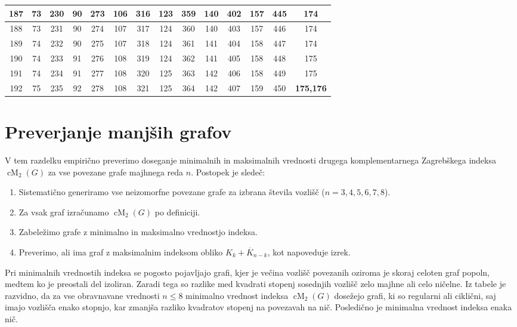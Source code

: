 \documentclass[fin1, tisk]{fmfdelo}
\newcommand{\cM}{\operatorname{cM}_2}
\begin{document}
{\begin{center}
\begin{tabular}{|c|c||c|c||c|c||c|c||c|c||c|c||c|c|}
187 & 73 & 230 & 90 & 273 & 106 & 316 & 123 & 359 & 140 & 402 & 157 & 445 & 174\\ \hline
188 & 73 & 231 & 90 & 274 & 107 & 317 & 124 & 360 & 140 & 403 & 157 & 446 & 174\\ \hline
189 & 74 & 232 & 90 & 275 & 107 & 318 & 124 & 361 & 141 & 404 & 158 & 447 & 174\\ \hline
190 & 74 & 233 & 91 & 276 & 108 & 319 & 124 & 362 & 141 & 405 & 158 & 448 & 175\\ \hline
191 & 74 & 234 & 91 & 277 & 108 & 320 & 125 & 363 & 142 & 406 & 158 & 449 & 175\\ \hline
192 & 75 & 235 & 92 & 278 & 108 & 321 & 125 & 364 & 142 & 407 & 159 & 450 & \textbf{175,176}\\ \hline
\end{tabular}
\end{center}
}
\newpage
\section{Preverjanje manjših grafov}
V tem razdelku empirično preverimo doseganje minimalnih in maksimalnih vrednosti drugega komplementarnega 
Zagrebškega indeksa $\cM(G)$ za vse povezane grafe majhnega reda $n$.
Postopek je sledeč:
\begin{enumerate}
\item Sistematično generiramo vse neizomorfne povezane grafe za izbrana števila vozlišč ($n = 3, 4, 5, 6, 7, 8$).
\item Za vsak graf izračunamo $\cM(G)$ po definiciji.
\item Zabeležimo grafe z minimalno in maksimalno vrednostjo indeksa.
\item Preverimo, ali ima graf z maksimalnim indeksom obliko $K_{k} + \overline{K}_{n-k}$, kot napoveduje izrek.
\end{enumerate}

Pri minimalnih vrednostih indeksa se pogosto pojavljajo grafi, kjer je večina vozlišč povezanih oziroma 
je skoraj celoten graf popoln, medtem ko je preostali del izoliran. Zaradi tega so razlike med kvadrati 
stopenj sosednjih vozlišč zelo majhne ali celo ničelne. Iz tabele je razvidno, da za 
vse obravnavane vrednosti $n \leq 8$ minimalno vrednost indeksa $\cM(G)$ dosežejo grafi, ki so 
regularni ali ciklični, saj imajo vozlišča enako stopnjo, kar zmanjša razliko kvadratov stopenj na 
povezavah na nič. Posledično je minimalna vrednost indeksa enaka nič.
\end{document}
